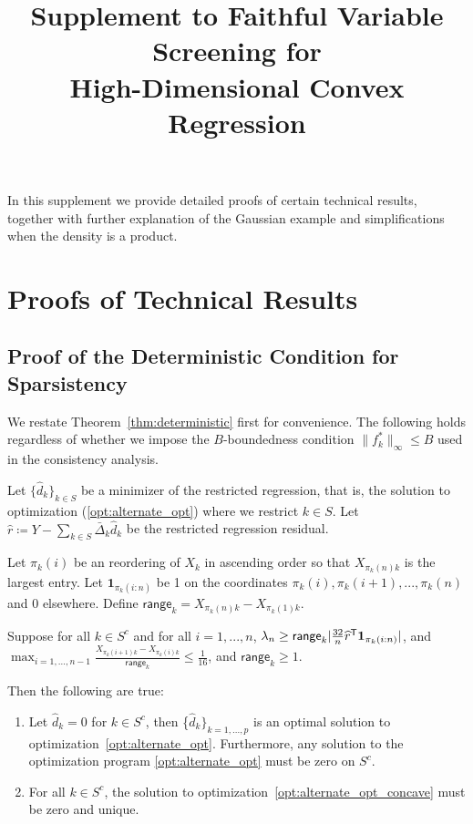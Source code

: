 \documentclass[12pt,pdftex,aos,noinfoline,addressasfootnote]{imsart}
\begin{document}
\begin{frontmatter}
\title{Supplement to Faithful Variable Screening for\\ High-Dimensional Convex Regression}
\end{frontmatter}

In this supplement we provide detailed proofs of certain technical results,
together with further explanation of the Gaussian example
and simplifications when the density is a product.

\section{Proofs of Technical Results}
 
 
 \subsection{Proof of the Deterministic Condition for Sparsistency}
 \label{sec:deterministic_proof}
 
We restate Theorem~\ref{thm:deterministic} first for convenience. 
The following holds regardless of whether we impose the
$B$-boundedness condition  $\|f_k^*\|_\infty \leq B$
used in the consistency analysis.
 
\begin{theorem} 
Let $\{\hat{d}_k \}_{k \in S}$ be a minimizer of the restricted regression, that is, the solution to optimization (\ref{opt:alternate_opt}) where we restrict $k \in S$. 
Let $\hat{r} \coloneqq Y - \sum_{k \in S} \bar{\Delta}_k \hat{d}_k$ be the restricted regression residual. 


Let $\pi_k(i)$ be an reordering of $X_k$ in ascending order so that $X_{\pi_k(n)k}$ is the largest entry. Let $\mathbf{1}_{\pi_k(i:n)}$ be 1 on the coordinates $\pi_k(i),\pi_k(i+1),...,\pi_k(n)$ and 0 elsewhere. Define $\mathsf{range}_k = X_{\pi_k(n)k} - X_{\pi_k(1)k}$.

Suppose for all $k\in S^c$ and for all $i=1,...,n$, $\lambda_n \geq \mathsf{range}_k | \frac{32}{n} \widehat{r}^{\mathsf{T}} \mbox{\boldmath $1$}_{\pi_k(i:n)}|$, and $\max_{i=1,...,n-1} \frac{X_{\pi_k(i+1)k} - X_{\pi_k(i)k}}{\mathsf{range}_k} \leq \frac{1}{16}$, and $\mathsf{range}_k \geq 1$.

Then the following are true:
\begin{enumerate}
\item Let $\hat{d}_k = 0$ for $k \in S^c$, then \{$\hat{d}_k\}_{k=1,...,p}$ is an optimal solution to optimization~\ref{opt:alternate_opt}. Furthermore, any solution to the optimization program \ref{opt:alternate_opt} must be zero on $S^c$.
\item For all $k \in S^c$, the solution to optimization~\ref{opt:alternate_opt_concave} must be zero and unique.
\end{enumerate}
\end{theorem}
\end{document}

